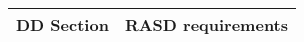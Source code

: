 \begin{table}[H]
\begin{center}
\begin{tabular}{p{} | p{}}
\hline
\textbf{DD Section} & \textbf{RASD requirements}\\
\hline
\end{tabular}
\end{center}
\end{table}